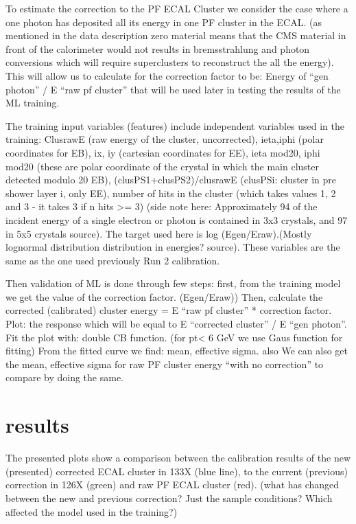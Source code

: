 To estimate the correction to the PF ECAL Cluster we consider the case where a one photon has deposited all its energy in one PF cluster in the ECAL.  (as mentioned in the data description zero material means that the CMS material in front of the calorimeter would not results in bremsstrahlung and photon conversions which will require superclusters to reconstruct the all the energy). This will allow us to calculate for the correction factor to be: Energy of “gen photon” / E “raw pf cluster” that will be used later in testing the results of the ML training.

The training input variables (features) include independent variables used in the training:   
ClusrawE (raw energy of the cluster, uncorrected), 
ieta,iphi (polar coordinates for EB), 
ix, iy (cartesian coordinates for EE), 
ieta mod20, iphi mod20 (these are polar coordinate of the crystal in which the main cluster detected modulo 20 EB), 
(clusPS1+clusPS2)/clusrawE (clusPSi: cluster in pre shower layer i, only EE),   
number of hits in the cluster (which takes values 1, 2 and 3 - it takes 3 if n hits >= 3) (side note here: Approximately 94  of the incident energy of a single electron or photon is contained in 3x3 crystals, and 97  in 5x5 crystals source). The target used here is log (Egen/Eraw).(Mostly lognormal distribution distribution in energies? source). These variables are the same as the one used previously Run 2 calibration.

Then validation of ML is done through few steps:  
first, from the training model we get the value of the correction factor. (Egen/Eraw)) 
Then, calculate the corrected (calibrated) cluster energy = E “raw pf cluster” * correction factor.  
Plot: the response which will be equal to E “corrected cluster” / E “gen photon”. 
Fit the plot with: double CB function. (for pt< 6 GeV we use Gaus function for fitting) 
From the fitted curve we find: mean, effective sigma. also We can also get the mean, effective sigma for raw PF cluster energy “with no correction” to compare by doing the same.





\section{results}

The presented plots show a comparison between the calibration results of the new (presented) corrected ECAL cluster in 133X (blue line), to the current (previous) correction in 126X (green) and raw PF ECAL cluster (red). (what has changed between the new and previous correction? Just the sample conditions? Which affected the model used in the training?)  

